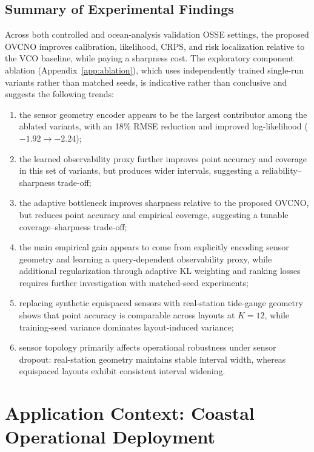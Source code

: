 \documentclass[11pt,a4paper]{article}
\begin{document}
\subsection{Summary of Experimental Findings}

Across both controlled and ocean-analysis validation OSSE settings, the proposed OVCNO improves calibration, likelihood, CRPS, and risk localization relative to the VCO baseline, while paying a sharpness cost. The exploratory component ablation (Appendix~\ref{app:ablation}), which uses independently trained single-run variants rather than matched seeds, is indicative rather than conclusive and suggests the following trends:
\begin{enumerate}
    \item the sensor geometry encoder appears to be the largest contributor among the ablated variants, with an 18\% RMSE reduction and improved log-likelihood ($-1.92 \to -2.24$);
    \item the learned observability proxy further improves point accuracy and coverage in this set of variants, but produces wider intervals, suggesting a reliability--sharpness trade-off;
    \item the adaptive bottleneck improves sharpness relative to the proposed OVCNO, but reduces point accuracy and empirical coverage, suggesting a tunable coverage--sharpness trade-off;
    \item the main empirical gain appears to come from explicitly encoding sensor geometry and learning a query-dependent observability proxy, while additional regularization through adaptive KL weighting and ranking losses requires further investigation with matched-seed experiments;
    \item replacing synthetic equispaced sensors with real-station tide-gauge geometry shows that point accuracy is comparable across layouts at $K=12$, while training-seed variance dominates layout-induced variance;
    \item sensor topology primarily affects operational robustness under sensor dropout: real-station geometry maintains stable interval width, whereas equispaced layouts exhibit consistent interval widening.
\end{enumerate}

\section{Application Context: Coastal Operational Deployment}
\label{sec:application}
\end{document}
